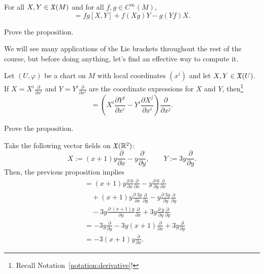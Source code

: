 \begin{proposition}
  For all $X, Y \in \mathfrak{X}(M)$ and for all $f,g\in C^\infty(M)$,
  \begin{equation}
    [fX, gY] = fg[X,Y] + f(Xg)Y - g(Yf)X.
  \end{equation}
\end{proposition}
\begin{exercise}
  Prove the proposition.
\end{exercise}

We will see many applications of the Lie brackets throughout the rest of the course, but before doing anything, let's find an effective way to compute it.

\begin{proposition}
  Let $(U, \varphi)$ be a chart on $M$ with local coordinates $(x^i)$ and let $X,Y\in\mathfrak{X}(U)$.
  If $X = X^i \frac{\partial }{\partial x^i}$ and $Y = Y^i \frac{\partial}{\partial x^i}$ are the coordinate expressions for $X$ and $Y$, then\footnote{Recall Notation~\ref{notation:derivative}!}
  \begin{equation}
    [X,Y] = \left(X^i\frac{\partial Y^j}{\partial x^i} - Y^i\frac{\partial X^j}{\partial x^i}\right)\frac{\partial}{\partial x^j}.
  \end{equation}
\end{proposition}
\begin{exercise}
  Prove the proposition.
\end{exercise}

\begin{example}
  Take the following vector fields on $\mathfrak{X}(\mathbb{R}^2)$:
  \begin{equation}
    X := (x+1)y \frac{\partial}{\partial x} - y \frac{\partial}{\partial y},\qquad
    Y := 3y \frac{\partial}{\partial y}.
  \end{equation}
  Then, the previous proposition implies
  \begin{align}
    [X,Y]
     & = (x+1)y  \frac{\partial\; 0}{\partial x} \frac{\partial}{\partial x} - y \frac{\partial\; 0}{\partial y} \frac{\partial}{\partial x}         \\
     & \quad + (x+1)y  \frac{\partial\; 3y}{\partial x} \frac{\partial}{\partial y} - y \frac{\partial\; 3y}{\partial y} \frac{\partial}{\partial y} \\
     & \quad - 3y \frac{\partial\; (x+1)y}{\partial y} \frac{\partial}{\partial x} + 3y \frac{\partial\; y}{\partial y} \frac{\partial}{\partial y}  \\
     & = - 3y \frac{\partial}{\partial y} -3 y(x+1) \frac{\partial}{\partial x} + 3y \frac{\partial}{\partial y}                                     \\
     & = -3(x+1)y \frac{\partial}{\partial x}.
  \end{align}
\end{example}


